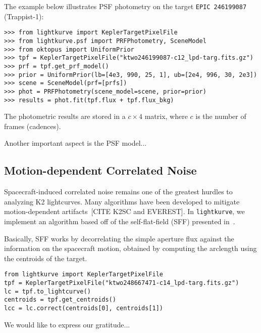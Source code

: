 \documentclass[twocolumn]{aastex62}
\newcommand{\lightkurve}{\texttt{lightkurve}}
\begin{document}
The example below illustrates PSF photometry on the target \texttt{EPIC 246199087}
(Trappist-1):

\begin{verbatim}
>>> from lightkurve import KeplerTargetPixelFile
>>> from lightkurve.psf import PRFPhotometry, SceneModel
>>> from oktopus import UniformPrior
>>> tpf = KeplerTargetPixelFile("ktwo246199087-c12_lpd-targ.fits.gz")
>>> prf = tpf.get_prf_model()
>>> prior = UniformPrior(lb=[4e3, 990, 25, 1], ub=[2e4, 996, 30, 2e3])
>>> scene = SceneModel(prf=[prfs])
>>> phot = PRFPhotometry(scene_model=scene, prior=prior)
>>> results = phot.fit(tpf.flux + tpf.flux_bkg)
\end{verbatim}

The photometric results are stored in a $c \times 4$ matrix, where $c$ is the
number of frames (cadences).

Another important aspect is the PSF model...

\subsection{Motion-dependent Correlated Noise}
\label{subsection:motion}

Spacecraft-induced correlated noise remains one of the greatest hurdles to
analyzing K2 lightcurves. Many algorithms have been developed to mitigate
motion-dependent artifacts~\cite{vanderburg14}[CITE K2SC and EVEREST].
In \lightkurve, we implement an algorithm based off of the self-flat-field
(SFF) presented in~\cite{vanderburg14}.

Basically, SFF works by decorrelating the simple aperture flux
against the information on the spacecraft motion, obtained by computing the
arclength using the centroids of the target.

\begin{verbatim}
from lightkurve import KeplerTargetPixelFile
tpf = KeplerTargetPixelFile("ktwo248667471-c14_lpd-targ.fits.gz")
lc = tpf.to_lightcurve()
centroids = tpf.get_centroids()
lcc = lc.correct(centroids[0], centroids[1])
\end{verbatim}

\acknowledgments

We would like to express our gratitude...

\vspace{5mm}
\end{document}
